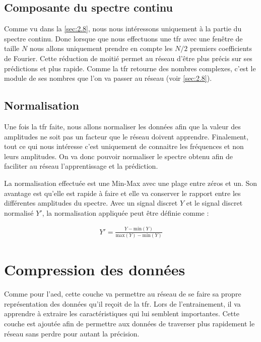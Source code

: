 \subsection{Composante du spectre continu}

Comme vu dans la \autoref{sec:2.8}, nous nous intéressons uniquement à la partie du spectre continu. Donc lorsque que nous effectuons une \gls{tfr} avec une fenêtre de taille $N$ nous allons uniquement prendre en compte les $N/2$ premiers coefficients de Fourier. Cette réduction de moitié permet au réseau d'être plus précis sur ses prédictions et plus rapide. Comme la \gls{tfr} retourne des nombres complexes, c'est le module de ses nombres que l'on va passer au réseau (voir \autoref{sec:2.8}).

\subsection{Normalisation}

Une fois la \gls{tfr} faite, nous allons normaliser les données afin que la valeur des amplitudes ne soit pas un facteur que le réseau doivent apprendre. Finalement, tout ce qui nous intéresse c'est uniquement de connaitre les fréquences et non leurs amplitudes. On va donc pouvoir normaliser le spectre obtenu afin de faciliter au réseau l'apprentissage et la prédiction.

La normalisation effectuée est une Min-Max avec une plage entre zéros et un. Son avantage est qu'elle est rapide à faire et elle va conserver le rapport entre les différentes amplitudes du spectre. Avec un signal discret $Y$ et le signal discret normalisé $Y'$, la normalisation appliquée peut être définie comme :

{\Large
	\setlength{\abovedisplayskip}{-0.5cm}
	\begin{align*}
		Y' = \frac{Y-\text{min}(Y)}{\text{max}(Y)-\text{min}(Y)}
	\end{align*}
}

\section{Compression des données}
\label{sec:5.4}

Comme pour l'\gls{aed}, cette couche va permettre au réseau de se faire sa propre représentation des données qu'il reçoit de la \gls{tfr}. Lors de l'entrainement, il va apprendre à extraire les caractéristiques qui lui semblent importantes. Cette couche est ajoutée afin de permettre aux données de traverser plus rapidement le réseau sans perdre pour autant la précision.

